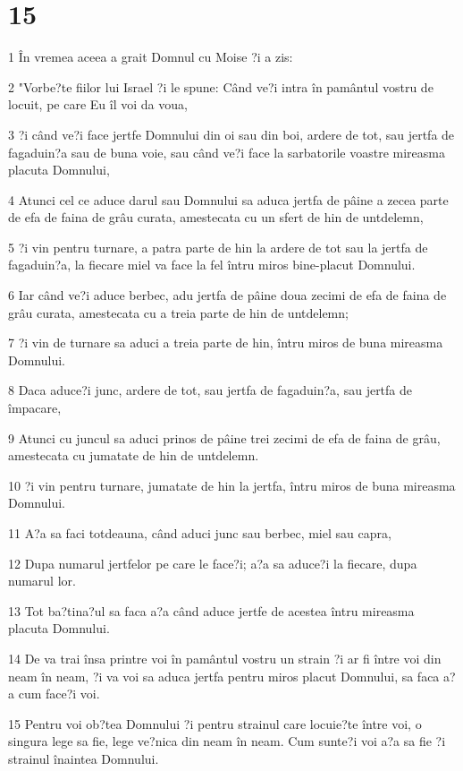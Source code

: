 \chapter{15}

\par 1 În vremea aceea a grait Domnul cu Moise ?i a zis:
\par 2 "Vorbe?te fiilor lui Israel ?i le spune: Când ve?i intra în pamântul vostru de locuit, pe care Eu îl voi da voua,
\par 3 ?i când ve?i face jertfe Domnului din oi sau din boi, ardere de tot, sau jertfa de fagaduin?a sau de buna voie, sau când ve?i face la sarbatorile voastre mireasma placuta Domnului,
\par 4 Atunci cel ce aduce darul sau Domnului sa aduca jertfa de pâine a zecea parte de efa de faina de grâu curata, amestecata cu un sfert de hin de untdelemn,
\par 5 ?i vin pentru turnare, a patra parte de hin la ardere de tot sau la jertfa de fagaduin?a, la fiecare miel va face la fel întru miros bine-placut Domnului.
\par 6 Iar când ve?i aduce berbec, adu jertfa de pâine doua zecimi de efa de faina de grâu curata, amestecata cu a treia parte de hin de untdelemn;
\par 7 ?i vin de turnare sa aduci a treia parte de hin, întru miros de buna mireasma Domnului.
\par 8 Daca aduce?i junc, ardere de tot, sau jertfa de fagaduin?a, sau jertfa de împacare,
\par 9 Atunci cu juncul sa aduci prinos de pâine trei zecimi de efa de faina de grâu, amestecata cu jumatate de hin de untdelemn.
\par 10 ?i vin pentru turnare, jumatate de hin la jertfa, întru miros de buna mireasma Domnului.
\par 11 A?a sa faci totdeauna, când aduci junc sau berbec, miel sau capra,
\par 12 Dupa numarul jertfelor pe care le face?i; a?a sa aduce?i la fiecare, dupa numarul lor.
\par 13 Tot ba?tina?ul sa faca a?a când aduce jertfe de acestea întru mireasma placuta Domnului.
\par 14 De va trai însa printre voi în pamântul vostru un strain ?i ar fi între voi din neam în neam, ?i va voi sa aduca jertfa pentru miros placut Domnului, sa faca a?a cum face?i voi.
\par 15 Pentru voi ob?tea Domnului ?i pentru strainul care locuie?te între voi, o singura lege sa fie, lege ve?nica din neam în neam. Cum sunte?i voi a?a sa fie ?i strainul înaintea Domnului.
